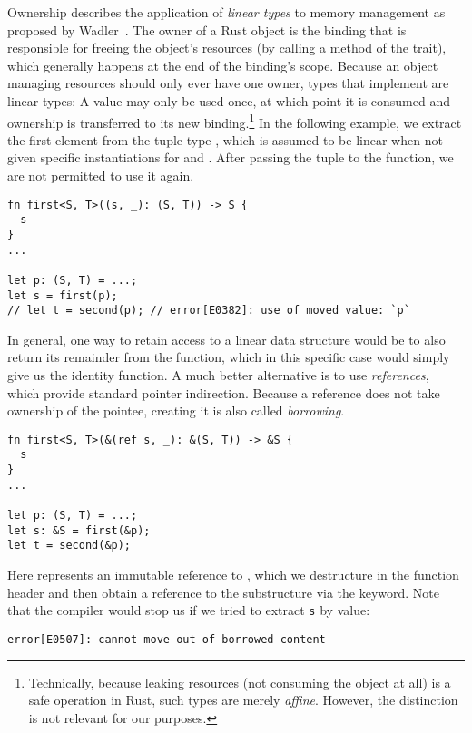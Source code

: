 Ownership describes the application of \emph{linear types} to memory management
as proposed by Wadler~\cite{wadler1990linear}. The owner of a Rust object is the binding that is responsible for freeing the
object's resources (by calling a method of the  trait), which
generally happens at the end of the binding's scope.
Because an object managing resources should only ever have one owner, types that implement
 are linear types: A value may only be used once, at which point it is
consumed and ownership is transferred to its new binding.\footnote{Technically,
  because leaking resources (\ie not consuming the object at all) is a safe operation in Rust, such types are merely
  \emph{affine}. However, the distinction is not relevant for our purposes.
} In the following example, we extract the first element from the tuple type
, which is assumed to be linear when not given specific
instantiations for  and . After passing the tuple to the function,
we are not permitted to use it again. 

\begin{verbatim}
fn first<S, T>((s, _): (S, T)) -> S {
  s
}
...

let p: (S, T) = ...;
let s = first(p);
// let t = second(p); // error[E0382]: use of moved value: `p`
\end{verbatim}

In general, one way to retain access to a linear data structure would be to also
return its remainder from the
function, which in this specific case would simply give us the identity function.
A much better alternative is to use \emph{references}, which provide standard
pointer indirection. Because a reference does not take ownership of the pointee,
creating it is also called \emph{borrowing}.

\begin{verbatim}
fn first<S, T>(&(ref s, _): &(S, T)) -> &S {
  s
}
...

let p: (S, T) = ...;
let s: &S = first(&p);
let t = second(&p);
\end{verbatim}

Here  represents an immutable reference to , which we
destructure in the function header and then obtain a reference to the
substructure via the  keyword. Note that the compiler would stop us if we tried to extract \texttt{s} by value:

\begin{verbatim}
error[E0507]: cannot move out of borrowed content
\end{verbatim}

